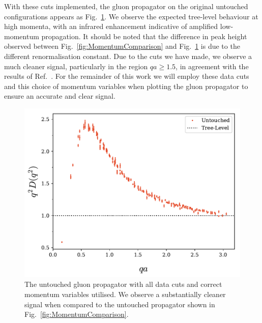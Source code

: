 With these cuts implemented, the gluon propagator on the original untouched configurations appears as Fig.~\ref{fig:UntouchedPropagator}. We observe the expected tree-level behaviour at high momenta, with an infrared enhancement indicative of amplified low-momentum propagation. It should be noted that the difference in peak height observed between Fig.~\ref{fig:MomentumComparison} and Fig.~\ref{fig:UntouchedPropagator} is due to the different renormalisation constant. Due to the cuts we have made, we observe a much cleaner signal, particularly in the region $qa\geq 1.5$, in agreement with the results of Ref.~\cite{Bonnet:2001uh}. For the remainder of this work we will employ these data cuts and this choice of momentum variables when plotting the gluon propagator to ensure an accurate and clear signal.
%
\begin{figure}
\centering
\includegraphics[width=\linewidth]{./ScalarGluComp_q2_NoCoolU.pdf}
\caption[The untouched gluon propagator with all data cuts and correct momentum variables utilised.]{\label{fig:UntouchedPropagator} The untouched gluon propagator with all data cuts and correct momentum variables utilised. We observe a substantially cleaner signal when compared to the untouched propagator shown in Fig.~\ref{fig:MomentumComparison}.}
\end{figure}


